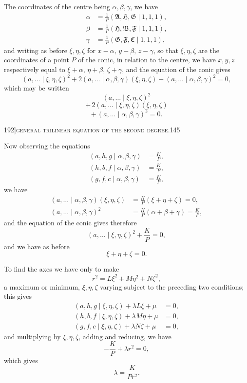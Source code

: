 \documentclass[11pt]{article}
\begin{document}
The coordinates of the centre being $\alpha, \beta, \gamma$, we have
\begin{align*}
\alpha &= \frac{1}{P}(\mathfrak{A}, \mathfrak{H}, \mathfrak{G} \mid 1, 1, 1),\\
\beta &= \frac{1}{P}(\mathfrak{H}, \mathfrak{B}, \mathfrak{F} \mid 1, 1, 1),\\
\gamma &= \frac{1}{P}(\mathfrak{G}, \mathfrak{F}, \mathfrak{C} \mid 1, 1, 1),
\end{align*}
and writing as before $\xi, \eta, \zeta$ for $x - \alpha,\, y - \beta,\, z - \gamma$, so that $\xi, \eta, \zeta$ are the coordinates of a point $P$ of the conic, in relation to the centre, we have $x, y, z$ respectively equal to $\xi + \alpha,\, \eta + \beta,\, \zeta + \gamma$, and the equation of the conic gives
\[
(a, \dots \mid \xi, \eta, \zeta)^{2} + 2(a, \dots \mid \alpha, \beta, \gamma)(\xi, \eta, \zeta) + (a, \dots \mid \alpha, \beta, \gamma)^{2} = 0,
\]
which may be written
\[
(a, \dots \mid \xi, \eta, \zeta)^{2}
\]
\[
+\, 2(a, \dots \mid \xi, \eta, \zeta)(\xi, \eta, \zeta)
\]
\[
+\, (a, \dots \mid \alpha, \beta, \gamma)^{2} = 0.
\]

\bigskip

\begin{center}\small 192]\hfill\textsc{general trilinear equation of the second degree.}\hfill 145\end{center}

\medskip

\noindent Now observing the equations
\begin{align*}
(a, h, g \mid \alpha, \beta, \gamma) &= \frac{K}{P},\\
(h, b, f \mid \alpha, \beta, \gamma) &= \frac{K}{P},\\
(g, f, c \mid \alpha, \beta, \gamma) &= \frac{K}{P},
\end{align*}
we have
\begin{align*}
(a, \dots \mid \alpha, \beta, \gamma)(\xi, \eta, \zeta) &= \frac{K}{P}(\xi + \eta + \zeta) = 0,\\
(a, \dots \mid \alpha, \beta, \gamma)^{2} &= \frac{K}{P}(\alpha + \beta + \gamma) = \frac{K}{P},
\end{align*}
and the equation of the conic gives therefore
\[
(a, \dots \mid \xi, \eta, \zeta)^{2} + \frac{K}{P} = 0,
\]
and we have as before
\[
\xi + \eta + \zeta = 0.
\]

To find the axes we have only to make
\[
r^{2} = L\xi^{2} + M\eta^{2} + N\zeta^{2},
\]
a maximum or minimum, $\xi, \eta, \zeta$ varying subject to the preceding two conditions; this gives
\begin{align*}
(a, h, g \mid \xi, \eta, \zeta) + \lambda L\xi + \mu &= 0,\\
(h, b, f \mid \xi, \eta, \zeta) + \lambda M\eta + \mu &= 0,\\
(g, f, c \mid \xi, \eta, \zeta) + \lambda N\zeta + \mu &= 0,
\end{align*}
and multiplying by $\xi, \eta, \zeta$, adding and reducing, we have
\[
-\frac{K}{P} + \lambda r^{2} = 0,
\]
which gives
\[
\lambda = \frac{K}{P r^{2}}.
\]
\end{document}
